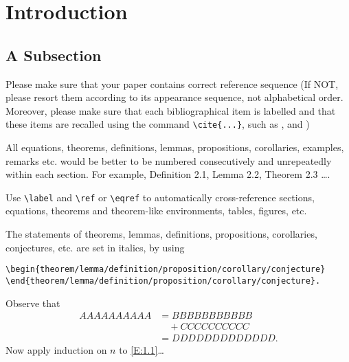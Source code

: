 \documentclass{amse}
\numberwithin{equation}{section} %
\begin{document}



\section{Introduction}

\subsection{A Subsection}

Please make sure that your paper contains correct reference
sequence (If NOT, please resort them according to its appearance
sequence, not alphabetical order. Moreover, please make sure that
each bibliographical item is labelled and that these items are
recalled using the command \verb|\cite{...}|, such as \cite{ref1},
and \cite{ref2,ref3,ref4,ref5})

All equations, theorems, definitions, lemmas, propositions,
corollaries, examples, remarks etc. would be better to be numbered
consecutively and unrepeatedly within each section. For example,
Definition 2.1, Lemma 2.2, Theorem 2.3 \ldots.

Use \verb|\label| and \verb|\ref| or \verb|\eqref| to
automatically cross-reference sections, equations, theorems and
theorem-like environments, tables, figures, etc.

\begin{theorem}\label{th:1.1} %
The statements of theorems, lemmas, definitions, propositions,
corollaries, conjectures, etc. are set in italics, by using
\begin{verbatim}
\begin{theorem/lemma/definition/proposition/corollary/conjecture}
\end{theorem/lemma/definition/proposition/corollary/conjecture}.
\end{verbatim}
\end{theorem}

\begin{prof}  %
Observe that
\begin{align}\label{E:1.1}
AAAAAAAAAA &= BBBBBBBBBBB\nonumber \\
           &\quad + CCCCCCCCCC\nonumber \\
           &= DDDDDDDDDDDDD.
\end{align}
Now apply induction on $n$ to \eqref{E:1.1}\ldots
\end{prof}
\end{document}
